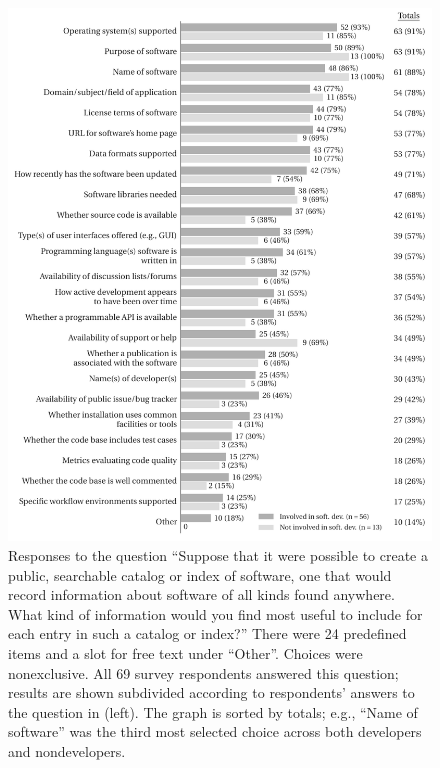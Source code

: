 \documentclass{casicswhitepaper}
\begin{document}
\begin{figure}[t]
  \vspace*{-1ex}
  \centering
  \includegraphics{files/plots/info-to-include-in-index-v5.pdf}
  \vspace*{-5ex}
  \caption{Responses to the question ``Suppose that it were possible to create a public, searchable catalog or index of software, one that would record information about software of all kinds found anywhere.  What kind of information would you find most useful to include for each entry in such a catalog or index?'' There were 24 predefined items and a slot for free text under ``Other''.  Choices were nonexclusive.  All 69 survey respondents answered this question; results are shown subdivided according to respondents' answers to the question in  (left).  The graph is sorted by totals; e.g., ``Name of software'' was the third most selected choice across both developers and nondevelopers.}
  \label{info-to-include}
\end{figure}

% 
\end{document}

